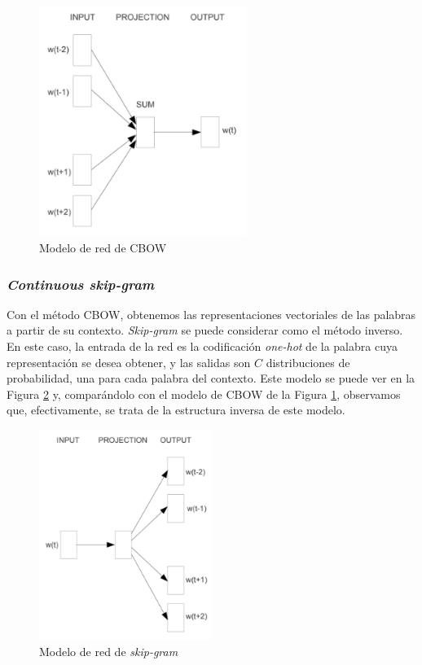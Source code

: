 \begin{figure}
    \centering
    \includegraphics[width=0.6\textwidth]{images/word2vec/cbow.png}
    \caption{Modelo de red de CBOW}
    \label{fig:cbow}
\end{figure}

\subsubsection{\textit{Continuous skip-gram}}

Con el método CBOW, obtenemos las representaciones vectoriales de las palabras a
partir de su contexto. \textit{Skip-gram} se puede considerar como el método
inverso. En este caso, la entrada de la red es la codificación \textit{one-hot}
de la palabra cuya representación se desea obtener, y las salidas son $C$
distribuciones de probabilidad, una para cada palabra del contexto. Este modelo
se puede ver en la Figura \ref{fig:skip-gram} y, comparándolo con el modelo
de CBOW de la Figura \ref{fig:cbow}, observamos que, efectivamente, se trata de
la estructura inversa de este modelo.

\begin{figure}
    \centering
    \includegraphics[width=0.5\textwidth]{images/word2vec/skip-gram.png}
    \caption{Modelo de red de \textit{skip-gram}}
    \label{fig:skip-gram}
\end{figure}

